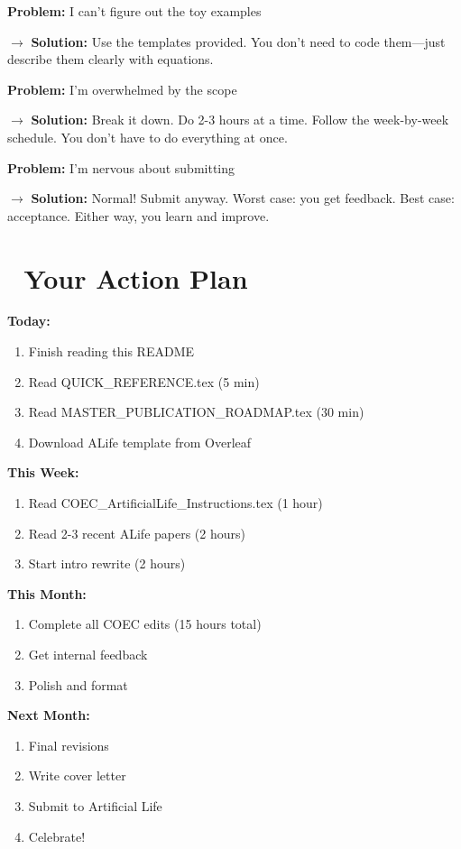 \documentclass[11pt]{article}
\begin{document}
\textbf{Problem:} I can't figure out the toy examples

$\rightarrow$ \textbf{Solution:} Use the templates provided. You don't need to code them—just describe them clearly with equations.

\textbf{Problem:} I'm overwhelmed by the scope

$\rightarrow$ \textbf{Solution:} Break it down. Do 2-3 hours at a time. Follow the week-by-week schedule. You don't have to do everything at once.

\textbf{Problem:} I'm nervous about submitting

$\rightarrow$ \textbf{Solution:} Normal! Submit anyway. Worst case: you get feedback. Best case: acceptance. Either way, you learn and improve.

\section*{🚀 Your Action Plan}

\textbf{Today:}
\begin{enumerate}
    \item Finish reading this README
    \item Read QUICK\_REFERENCE.tex (5 min)
    \item Read MASTER\_PUBLICATION\_ROADMAP.tex (30 min)
    \item Download ALife template from Overleaf
\end{enumerate}

\textbf{This Week:}
\begin{enumerate}
    \item Read COEC\_ArtificialLife\_Instructions.tex (1 hour)
    \item Read 2-3 recent ALife papers (2 hours)
    \item Start intro rewrite (2 hours)
\end{enumerate}

\textbf{This Month:}
\begin{enumerate}
    \item Complete all COEC edits (15 hours total)
    \item Get internal feedback
    \item Polish and format
\end{enumerate}

\textbf{Next Month:}
\begin{enumerate}
    \item Final revisions
    \item Write cover letter
    \item Submit to Artificial Life
    \item Celebrate! 🎉
\end{enumerate}
\end{document}
